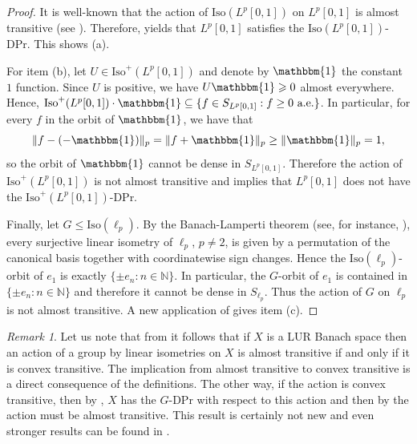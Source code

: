 \documentclass[a4paper,12pt]{amsart}
\theoremstyle{definition}
\theoremstyle{definition}
\theoremstyle{remark}
\newtheorem{remark}[theorem]{Remark}
\numberwithin{equation}{section}
\newcommand{\N}{\mathbb{N}}
\newcommand{\Iso}{\mathrm{Iso}}
\renewcommand{\geq}{\geqslant}
\renewcommand{\leq}{\leqslant}
\newcommand{\<}{\langle}
\renewcommand{\>}{\rangle}
\begin{document}
	\begin{proof} It is well-known that the action of $\Iso(L^p[0,1])$ on $L^p[0,1]$ is almost transitive (see \cite[Theorem~9.6.3]{RolewiczStefan1985Mls}). Therefore,  yields that $L^p[0,1]$ satisfies the $\Iso(L^p[0,1])$-DPr. This shows (a).
		
		For item (b), let $U\in \Iso^+(L^p[0,1])$ and denote by $\mathbbm{1}$ the constant $1$ function. Since $U$ is positive, we have $U \mathbbm{1} \geq 0$ almost everywhere. Hence, $\Iso^+(L^p[0,1])\cdot \mathbbm{1} \subseteq \{f\in S_{L^p[0,1]}: f\ge 0 \text{ a.e.}\}$. In particular, for every $f$ in the orbit of $\mathbbm{1}$, we have that 
		\begin{equation*} 
			\|f-(-\mathbbm{1})\|_p=\|f+\mathbbm{1}\|_p \ge \|\mathbbm{1}\|_p = 1,
		\end{equation*} 
		so the orbit of $\mathbbm{1}$ cannot be dense in $S_{L^p[0,1]}$. Therefore the action of $\Iso^+(L^p[0,1])$ is not almost transitive and  implies that $L^p[0,1]$ does not have the $\Iso^+(L^p[0,1])$-DPr.
		
		Finally, let $G\leq \Iso(\ell_p)$. By the Banach-Lamperti theorem (see, for instance, \cite[Theorem 3.2.5]{FlemingJamison2003}), every surjective linear isometry of $\ell_p$, $p\neq 2$, is given by a permutation of the canonical basis together with coordinatewise sign changes. Hence the $\Iso(\ell_p)$-orbit of $e_1$ is exactly $\{\pm e_n : n\in\N\}$. In particular, the $G$-orbit of $e_1$ is contained in $\{\pm e_n : n\in \N \}$ and therefore it cannot be dense in $S_{\ell_p}$. Thus the action of $G$ on $\ell_p$ is not almost transitive. A new application of   gives item (c).
	\end{proof}
	
	
	
	\begin{remark}
		Let us note that from  it follows that if $X$ is a LUR Banach space then an action of a group by linear isometries on $X$ is almost transitive if and only if it is convex transitive. The implication from almost transitive to convex transitive is a direct consequence of the definitions. The other way, if the action is convex transitive, then by , $X$ has the $G$-DPr with respect to this action and then by  the action must be almost transitive. This result is certainly not new and even stronger results can be found in \cite{BECERRAGUERRERO2009108}.
	\end{remark}
	
\end{document}
